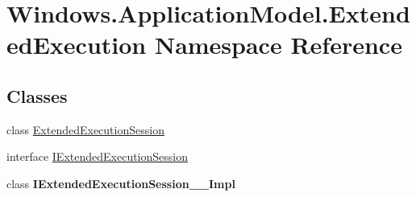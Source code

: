 \hypertarget{namespace_windows_1_1_application_model_1_1_extended_execution}{}\section{Windows.\+Application\+Model.\+Extended\+Execution Namespace Reference}
\label{namespace_windows_1_1_application_model_1_1_extended_execution}
\subsection*{Classes}
\begin{DoxyCompactItemize}
\item 
class \hyperlink{class_windows_1_1_application_model_1_1_extended_execution_1_1_extended_execution_session}{Extended\+Execution\+Session}
\item 
interface \hyperlink{interface_windows_1_1_application_model_1_1_extended_execution_1_1_i_extended_execution_session}{I\+Extended\+Execution\+Session}
\item 
class {\bfseries I\+Extended\+Execution\+Session\+\_\+\+\_\+\+Impl}
\end{DoxyCompactItemize}
